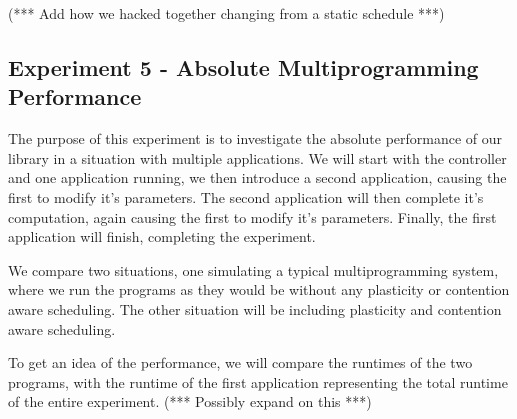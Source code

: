 (*** Add how we hacked together changing from a static schedule ***)





\subsection{Experiment 5 - Absolute Multiprogramming Performance}

The purpose of this experiment is to investigate the absolute performance of our library in a situation with multiple applications. We will start with the controller and one application running, we then introduce a second application, causing the first to modify it's parameters. The second application will then complete it's computation, again causing the first to modify it's parameters. Finally, the first application will finish, completing the experiment. 

We compare two situations, one simulating a typical multiprogramming system, where we run the programs as they would be without any plasticity or contention aware scheduling. The other situation will be including plasticity and contention aware scheduling.

To get an idea of the performance, we will compare the runtimes of the two programs, with the runtime of the first application representing the total runtime of the entire experiment. (*** Possibly expand on this ***)

